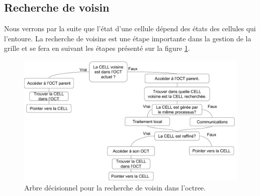
\subsection{Recherche de voisin}
Nous verrons par la suite que l'état d'une cellule dépend des états des cellules qui l'entoure.
La recherche de voisins est une étape importante dans la gestion de la grille et se fera en suivant les étapes présenté sur la figure \ref{fig:voisin}.

\begin{figure}[bth]
        \includegraphics[width=.95\linewidth]{img/02/voisins.pdf} 
        \caption{Arbre décisionnel pour la recherche de voisin dans l'octree.
     	\label{fig:voisin} }
\end{figure}

%
%

